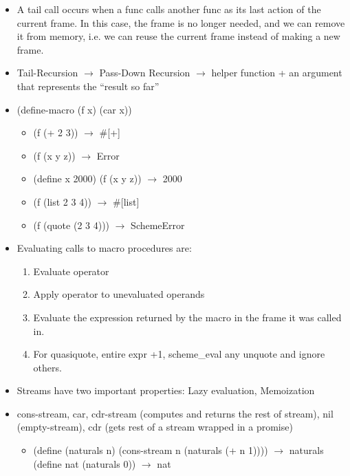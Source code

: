 \documentclass{article}
\begin{document}
\begin{itemize}
	\item A {\color{red} tail call} occurs when a func calls another func as its last action of the current frame. In this case, the frame is no longer needed, and we can remove it from memory, i.e. we can reuse the current frame instead of making a new frame.
	\item Tail-Recursion $\longrightarrow$ Pass-Down Recursion $\longrightarrow$ helper function + an argument that represents the “result so far”

\end{itemize}



\begin{itemize}
	\item (define-macro (f x) (car x))
	\begin{itemize}
		\item (f (+ 2 3)) $\longrightarrow$ \#[+]
		\item (f (x y z)) $\longrightarrow$ Error
		\item (define x 2000) (f (x y z)) $\longrightarrow$ 2000
		\item (f (list 2 3 4)) $\longrightarrow$ \#[list]
		\item (f (quote (2 3 4))) $\longrightarrow$ SchemeError
	\end{itemize}
	\item Evaluating calls to macro procedures are:
	\begin{enumerate}
		\item Evaluate operator
		\item Apply operator to unevaluated operands
		\item Evaluate the expression returned by the macro in the frame it was called in.
		\item For quasiquote, entire expr +1, scheme\_eval any unquote and ignore others.
	\end{enumerate}
	\item Streams have two important properties: Lazy evaluation, Memoization
	\item cons-stream, car, cdr-stream (computes and returns the rest of stream), nil (empty-stream), cdr (gets rest of a stream wrapped in a promise)
	\begin{itemize}
		\item (define (naturals n) (cons-stream n (naturals (+ n 1)))) $\longrightarrow$ naturals \\
		(define nat (naturals 0)) $\longrightarrow$ nat \\

\end{itemize}
\end{itemize}
\end{document}
